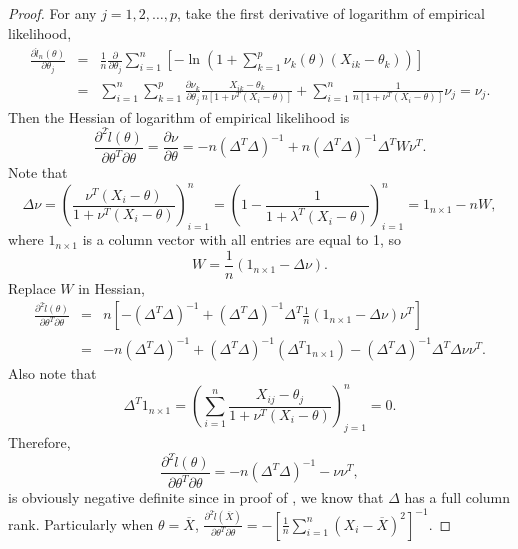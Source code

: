 \begin{proof}
For any $j=1,2,\ldots,p$, take the first derivative of logarithm
of empirical likelihood,
\begin{eqnarray*}
\frac{\partial\hat{l}_{n}\left(\theta\right)}{\partial\theta_{j}} & = & \frac{1}{n}\frac{\partial}{\partial\theta_{j}}\sum_{i=1}^{n}\left[-\ln\left(1+\sum_{k=1}^{p}\nu_{k}\left(\theta\right)\left(X_{ik}-\theta_{k}\right)\right)\right]\\
 & = & \sum_{i=1}^{n}\sum_{k=1}^{p}\frac{\partial\nu_{k}}{\partial\theta_{j}}\frac{X_{ik}-\theta_{k}}{n\left[1+\nu^{T}\left(X_{i}-\theta\right)\right]}+\sum_{i=1}^{n}\frac{1}{n\left[1+\nu^{T}\left(X_{i}-\theta\right)\right]}\nu_{j}=\nu_{j}.
\end{eqnarray*}
Then the Hessian of logarithm of empirical likelihood is 
\[
\frac{\partial^{2}\hat{l}\left(\theta\right)}{\partial\theta^{T}\partial\theta}=\frac{\partial\nu}{\partial\theta}=-n\left(\Delta^{T}\Delta\right)^{-1}+n\left(\Delta^{T}\Delta\right)^{-1}\Delta^{T}W\nu^{T}.
\]
Note that 
\[
\Delta\nu=\left(\frac{\nu^{T}\left(X_{i}-\theta\right)}{1+\nu^{T}\left(X_{i}-\theta\right)}\right)_{i=1}^{n}=\left(1-\frac{1}{1+\lambda^{T}\left(X_{i}-\theta\right)}\right)_{i=1}^{n}=1_{n\times1}-nW,
\]
where $1_{n\times1}$ is a column vector with all entries are equal
to 1, so 
\[
W=\frac{1}{n}\left(1_{n\times1}-\Delta\nu\right).
\]
 Replace $W$ in Hessian, 
\begin{eqnarray*}
\frac{\partial^{2}\hat{l}\left(\theta\right)}{\partial\theta^{T}\partial\theta} & = & n\left[-\left(\Delta^{T}\Delta\right)^{-1}+\left(\Delta^{T}\Delta\right)^{-1}\Delta^{T}\frac{1}{n}\left(1_{n\times1}-\Delta\nu\right)\nu^{T}\right]\\
 & = & -n\left(\Delta^{T}\Delta\right)^{-1}+\left(\Delta^{T}\Delta\right)^{-1}\left(\Delta^{T}1_{n\times1}\right)-\left(\Delta^{T}\Delta\right)^{-1}\Delta^{T}\Delta\nu\nu^{T}.
\end{eqnarray*}
Also note that 
\[
\Delta^{T}1_{n\times1}=\left(\sum_{i=1}^{n}\frac{X_{ij}-\theta_{j}}{1+\nu^{T}\left(X_{i}-\theta\right)}\right)_{j=1}^{n}=0.
\]
Therefore,
\begin{equation}
\frac{\partial^{2}\hat{l}\left(\theta\right)}{\partial\theta^{T}\partial\theta}=-n\left(\Delta^{T}\Delta\right)^{-1}-\nu\nu^{T},\label{eq:expression-fisher-inf-mat}
\end{equation}
is obviously negative definite since in proof of ,
we know that $\Delta$ has a full column rank. Particularly when $\theta=\overline{X}$,
$\frac{\partial^{2}\hat{l}\left(\overline{X}\right)}{\partial\theta^{T}\partial\theta}=-\left[\frac{1}{n}\sum_{i=1}^{n}\left(X_{i}-\overline{X}\right)^{2}\right]^{-1}$. 
\end{proof}

